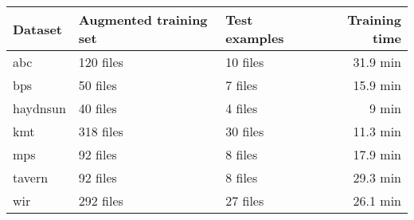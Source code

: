 \begin{tabular}{l|llr}
Dataset        & Augmented training set & Test examples & Training time \\ \hline
\gls{abc}      & 120 files                   & 10 files           & 31.9 min      \\
\gls{bps}      & 50  files                   & 7  files           & 15.9 min      \\
\gls{haydnsun} & 40  files                   & 4  files           & 9 min         \\
\gls{kmt}      & 318 files                   & 30 files           & 11.3 min      \\
\gls{mps}      & 92  files                   & 8  files           & 17.9 min      \\
\gls{tavern}   & 92  files                   & 8  files           & 29.3 min      \\
\gls{wir}      & 292 files                   & 27 files           & 26.1 min     
\end{tabular}
